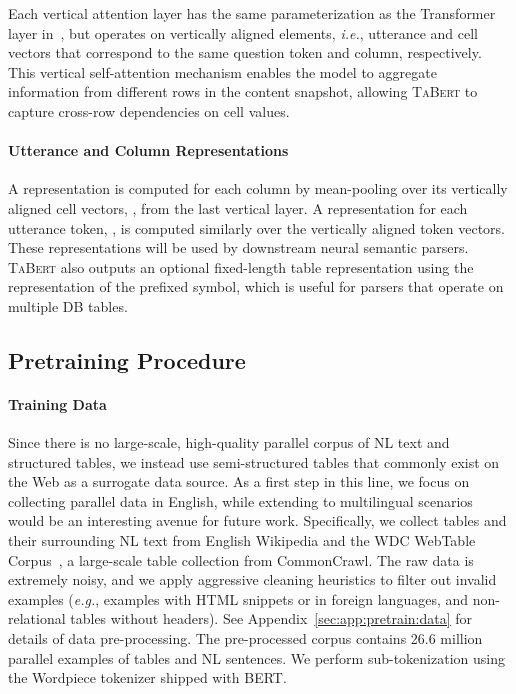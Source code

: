 \documentclass[11pt,a4paper]{article}
\def\model/{\textsc{TaBert}}
\renewcommand{\tt}[1]{\fontfamily{cmtt}\selectfont #1}
\newcommand{\eg}{\hbox{\emph{e.g.}}\xspace}
\newcommand{\ie}{\hbox{\emph{i.e.}}\xspace}
\begin{document}
Each vertical attention layer has the same parameterization as the Transformer layer in~\cite{Vaswani2017AttentionIA}, but operates on vertically aligned elements, \ie, utterance and cell vectors that correspond to the same question token and column, respectively. 
This vertical self-attention mechanism enables the model to aggregate information from different rows in the content snapshot, allowing \model/ to capture cross-row dependencies on cell values.


\paragraph{Utterance and Column Representations}
A representation  is computed for each column  by mean-pooling over its vertically aligned cell vectors, , from the last vertical layer.
A representation for each utterance token, , is computed similarly over the vertically aligned token vectors.
These 
representations will be used by downstream neural semantic parsers.
\model/ also outputs an optional fixed-length table representation  using the representation of the prefixed {\tt [CLS]} symbol, which is useful for parsers that operate on multiple DB tables.

\subsection{Pretraining Procedure}
\label{sec:model:pretraining}



\paragraph{Training Data} Since there is no large-scale, high-quality parallel corpus of NL text and structured tables, we instead use semi-structured tables that commonly exist on the Web as a surrogate data source.
As a first step in this line, we focus on collecting parallel data in English, while extending to multilingual scenarios would be an interesting avenue for future work. 
Specifically, we collect tables and their surrounding NL text from English Wikipedia and the WDC WebTable Corpus~\cite{Lehmberg2016ALP}, a large-scale table collection from CommonCrawl.
The raw data is extremely noisy, and we apply aggressive cleaning heuristics to filter out invalid examples (\eg, examples with HTML snippets or in foreign languages, and non-relational tables without headers).
See Appendix~\autoref{sec:app:pretrain:data} for details of data pre-processing.
The pre-processed corpus contains 26.6 million parallel examples of tables and NL sentences.
We perform sub-tokenization using the Wordpiece tokenizer shipped with BERT.
\end{document}

